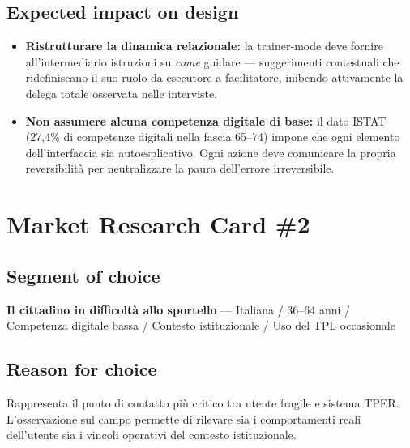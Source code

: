 ﻿\documentclass[11pt,a4paper]{article}
\begin{document}
\subsection*{Expected impact on design}
\begin{tcolorbox}[base]

\begin{itemize}[leftmargin=*,itemsep=6pt]

    \item \textbf{Ristrutturare la dinamica relazionale:}
    la trainer-mode deve fornire all'intermediario istruzioni su
    \textit{come} guidare --- suggerimenti contestuali che ridefiniscano
    il suo ruolo da esecutore a facilitatore, inibendo attivamente la
    delega totale osservata nelle interviste.

    \item \textbf{Non assumere alcuna competenza digitale di base:}
    il dato ISTAT (27,4\% di competenze digitali nella fascia 65--74)
    impone che ogni elemento dell'interfaccia sia autoesplicativo.
    Ogni azione deve comunicare la propria reversibilità per
    neutralizzare la paura dell'errore irreversibile.

\end{itemize}
\end{tcolorbox}

\newpage
\section{Market Research Card \#2}

\subsection*{Segment of choice}
\begin{tcolorbox}[base]
\textbf{Il cittadino in difficoltà allo sportello} --- Italiana /
36--64 anni / Competenza digitale bassa / Contesto istituzionale /
Uso del TPL occasionale
\end{tcolorbox}

\subsection*{Reason for choice}
\begin{tcolorbox}[base]
Rappresenta il punto di contatto più critico tra utente fragile e
sistema TPER. L'osservazione sul campo permette di rilevare sia i
comportamenti reali dell'utente sia i vincoli operativi del contesto
istituzionale.
\end{tcolorbox}
\end{document}
